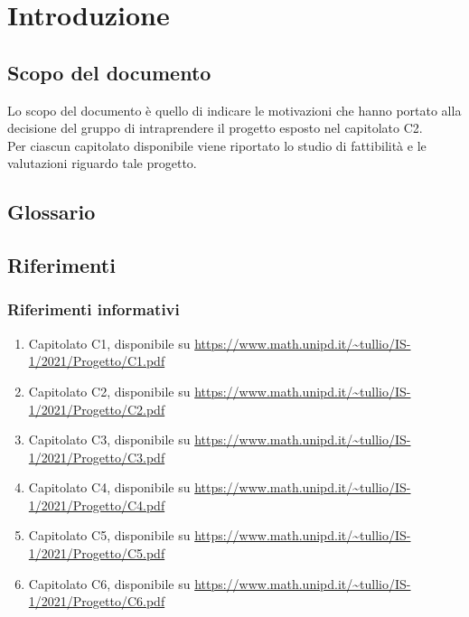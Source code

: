\section{Introduzione}\label{section:introduzione}

\subsection{Scopo del documento}
Lo scopo del documento è quello di indicare le motivazioni che hanno portato alla decisione del gruppo di intraprendere il progetto esposto nel capitolato C2.\\
Per ciascun capitolato disponibile viene riportato lo studio di fattibilità e le valutazioni riguardo tale progetto. 

\subsection{Glossario}
\gloDesc

\subsection{Riferimenti}
\subsubsection{Riferimenti informativi}
\begin{enumerate}
	\item \guillemotleft Capitolato C1\guillemotright, disponibile su \url{https://www.math.unipd.it/~tullio/IS-1/2021/Progetto/C1.pdf}
	\item \guillemotleft Capitolato C2\guillemotright, disponibile su \url{https://www.math.unipd.it/~tullio/IS-1/2021/Progetto/C2.pdf}
	\item \guillemotleft Capitolato C3\guillemotright, disponibile su \url{https://www.math.unipd.it/~tullio/IS-1/2021/Progetto/C3.pdf}
	\item \guillemotleft Capitolato C4\guillemotright, disponibile su \url{https://www.math.unipd.it/~tullio/IS-1/2021/Progetto/C4.pdf}
	\item \guillemotleft Capitolato C5\guillemotright, disponibile su \url{https://www.math.unipd.it/~tullio/IS-1/2021/Progetto/C5.pdf}
	\item \guillemotleft Capitolato C6\guillemotright, disponibile su \url{https://www.math.unipd.it/~tullio/IS-1/2021/Progetto/C6.pdf}
\end{enumerate}



